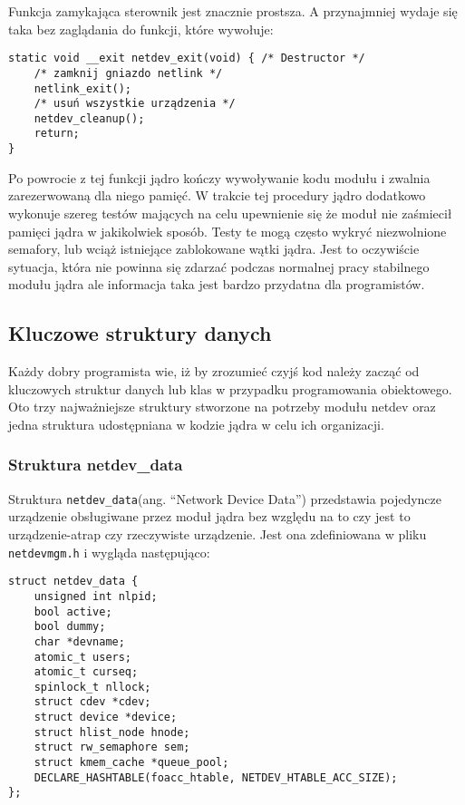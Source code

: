 \documentclass[10pt]{article}
\begin{document}
Funkcja zamykająca sterownik jest znacznie prostsza. A przynajmniej
wydaje się taka bez zaglądania do funkcji, które wywołuje:

\begin{verbatim}
static void __exit netdev_exit(void) { /* Destructor */
    /* zamknij gniazdo netlink */
    netlink_exit();
    /* usuń wszystkie urządzenia */
    netdev_cleanup();
    return;
}
\end{verbatim}

Po powrocie z tej funkcji jądro kończy wywoływanie kodu modułu i zwalnia
zarezerwowaną dla niego pamięć. W trakcie tej procedury jądro dodatkowo
wykonuje szereg testów mających na celu upewnienie się że moduł nie
zaśmiecił pamięci jądra w jakikolwiek sposób. Testy te mogą często
wykryć niezwolnione semafory, lub wciąż istniejące zablokowane wątki
jądra. Jest to oczywiście sytuacja, która nie powinna się zdarzać
podczas normalnej pracy stabilnego modułu jądra ale informacja taka jest
bardzo przydatna dla programistów.

\subsection{Kluczowe struktury danych}
\label{mainstructs}

Każdy dobry programista wie, iż by zrozumieć czyjś kod należy zacząć od
kluczowych struktur danych lub klas w przypadku programowania
obiektowego. Oto trzy najważniejsze struktury stworzone na potrzeby
modułu netdev oraz jedna struktura udostępniana w kodzie jądra w celu
ich organizacji.

\subsubsection{Struktura netdev\_data}

Struktura \texttt{netdev\_data}(ang. ``Network Device Data'')
przedstawia pojedyncze urządzenie obsługiwane przez moduł jądra bez
względu na to czy jest to urządzenie-atrap czy rzeczywiste urządzenie.
Jest ona zdefiniowana w pliku \texttt{netdevmgm.h} i wygląda
następująco:

\begin{verbatim}
struct netdev_data {
    unsigned int nlpid;
    bool active;
    bool dummy;
    char *devname;
    atomic_t users;
    atomic_t curseq;
    spinlock_t nllock;
    struct cdev *cdev;
    struct device *device;
    struct hlist_node hnode;
    struct rw_semaphore sem;
    struct kmem_cache *queue_pool;
    DECLARE_HASHTABLE(foacc_htable, NETDEV_HTABLE_ACC_SIZE);
};
\end{verbatim}
\end{document}
